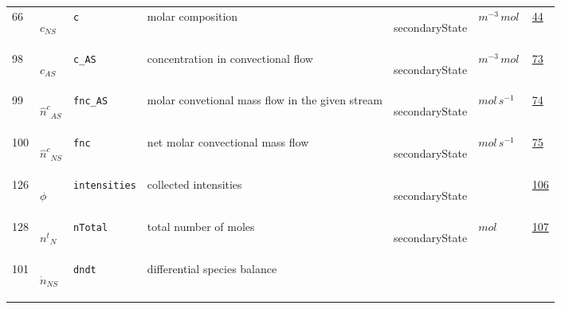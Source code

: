 \begin{longtable}{|p{1cm}|p{2.5cm}|p{4.5cm}|p{8cm}|p{3.0cm}|p{3cm}|p{1cm}|}
                 \\
    66
             & \hypertarget{"v:66"}{ $ {c}{_{{N S}}} $}
             & \verb|c|
             & molar composition
             & \begin{lay}secondaryState \end{lay}
             & $ m^{-3} \,mol \, $
             & \hyperlink{"e:44"}{ 44 }
                 \\
    98
             & \hypertarget{"v:98"}{ $ {c}{_{{A S}}} $}
             & \verb|c_AS|
             & concentration in convectional flow
             & \begin{lay}secondaryState \end{lay}
             & $ m^{-3} \,mol \, $
             & \hyperlink{"e:73"}{ 73 }
                 \\
    99
             & \hypertarget{"v:99"}{ $ {{\hat{n}^c}}{_{{A S}}} $}
             & \verb|fnc_AS|
             & molar convetional mass flow in the given stream
             & \begin{lay}secondaryState \end{lay}
             & $ mol \,s^{-1} \, $
             & \hyperlink{"e:74"}{ 74 }
                 \\
    100
             & \hypertarget{"v:100"}{ $ {{\hat{n}^c}}{_{{N S}}} $}
             & \verb|fnc|
             & net molar convectional mass flow
             & \begin{lay}secondaryState \end{lay}
             & $ mol \,s^{-1} \, $
             & \hyperlink{"e:75"}{ 75 }
                 \\
    126
             & \hypertarget{"v:126"}{ $ {\phi}{_{}} $}
             & \verb|intensities|
             & collected intensities
             & \begin{lay}secondaryState \end{lay}
             & $  $
             & \hyperlink{"e:106"}{ 106 }
                 \\
    128
             & \hypertarget{"v:128"}{ $ {{n^t}}{_{N}} $}
             & \verb|nTotal|
             & total number of moles
             & \begin{lay}secondaryState \end{lay}
             & $ mol \, $
             & \hyperlink{"e:107"}{ 107 }
                 \\
    101
             & \hypertarget{"v:101"}{ $ {\dot{n}}{_{{N S}}} $}
             & \verb|dndt|
             & differential species balance

\end{longtable}
